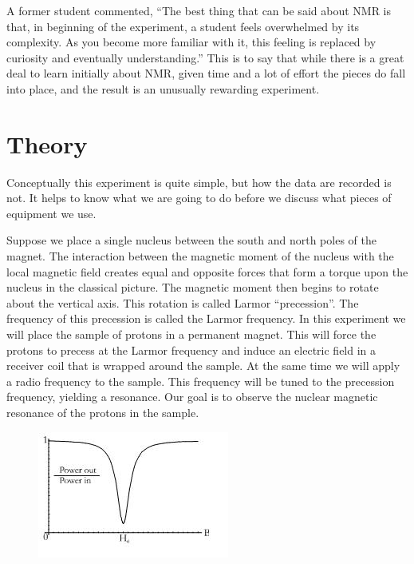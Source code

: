 \documentclass{../lab}
\begin{document}
A former student commented, ``The best thing that can be said about NMR is that, in beginning of the experiment, a student feels overwhelmed by its complexity. As you become more familiar with it, this feeling is replaced by curiosity and eventually understanding.'' This is to say that while there is a great deal to learn initially about NMR, given time and a lot of effort the pieces do fall into place, and the result is an unusually rewarding experiment.

\section{Theory}

Conceptually this experiment is quite simple, but how the data are recorded is not. It helps to know what we are going to do before we discuss what pieces of equipment we use.

Suppose we place a single nucleus between the south and north poles of the magnet. The interaction between the magnetic moment of the nucleus with the local magnetic field creates equal and opposite forces that form a torque upon the nucleus in the classical picture. The magnetic moment then begins to rotate about the vertical axis. This rotation is called Larmor ``precession''. The frequency of this precession is called the Larmor frequency. In this experiment we will place the sample of protons in a permanent magnet. This will force the protons to precess at the Larmor frequency and induce an electric field in a receiver coil that is wrapped around the sample. At the same time we will apply a radio frequency to the sample. This frequency will be tuned to the precession frequency, yielding a resonance. Our goal is to observe the nuclear magnetic resonance of the protons in the sample.


\begin{figure}[h]
    \centering
    \href{http://experimentationlab.berkeley.edu/sites/default/files/images/NMR1.jpg}{\includegraphics[width=0.5\linewidth]{images/NMR1.jpg}}
    \caption{}
    \label{fig:NMR1}
\end{figure}
\end{document}
